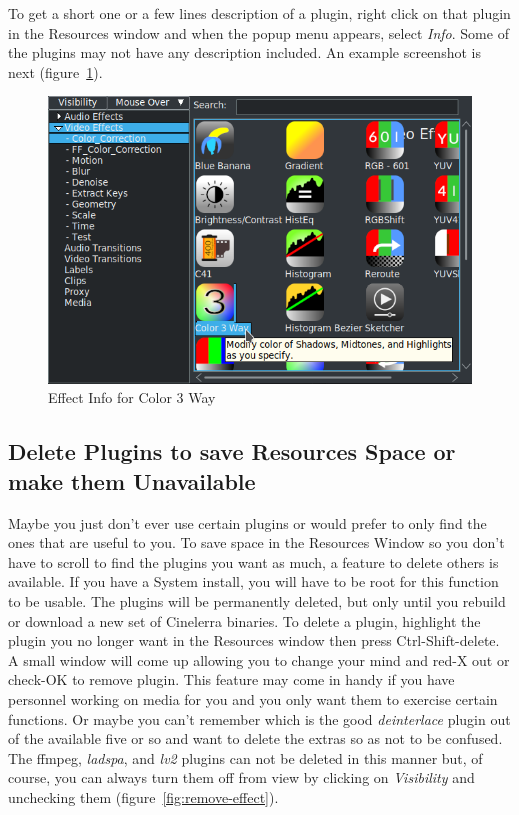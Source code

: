 To get a short one or a few lines description of a plugin, right click on that plugin in the Resources window and when the popup menu appears, select \textit{Info}. Some of the plugins may not have any description included. An example screenshot is next (figure~\ref{fig:info-effect}).

\begin{figure}[htpb]
    \centering
    \includegraphics[width=0.7\linewidth]{images/info-effect.png}
    \caption{Effect Info for Color 3 Way}
    \label{fig:info-effect}
\end{figure}

\subsection{Delete Plugins to save Resources Space or make them Unavailable}%
\label{sub:delete_plugin_resouces_unavaible}

Maybe you just don't ever use certain plugins or would prefer to only find the ones that are useful to you. To save space in the Resources Window so you don't have to scroll to find the plugins you want as much, a feature to delete others is available. If you have a System install, you will have to be root for this function to be usable. The plugins will be permanently deleted, but only until you rebuild or download a new set of Cinelerra binaries. To delete a plugin, highlight the plugin you no longer want in the Resources window then press Ctrl-Shift-delete. A small window will come up allowing you to change your mind and red-X out or check-OK to remove plugin. This feature may come in handy if you have personnel working on media for you and you only want them to exercise certain functions. Or maybe you can't remember which is the good \textit{deinterlace} plugin out of the available five or so and want to delete the extras so as not to be confused. The ffmpeg, \textit{ladspa}, and \textit{lv2} plugins can not be deleted in this manner but, of course, you can always turn them off from view by clicking on \textit{Visibility} and unchecking them (figure~\ref{fig:remove-effect}).

